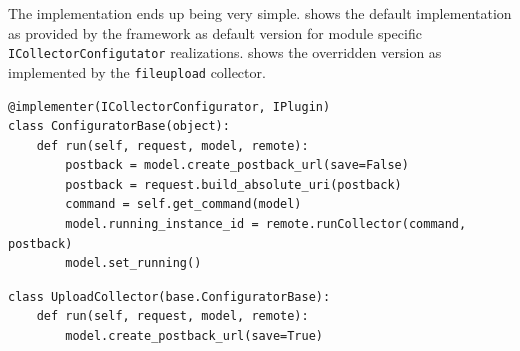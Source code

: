 The implementation ends up being very simple.  shows the default implementation as provided by the framework as default version for module specific \texttt{ICollector\BreakableSlash{}Configutator} realizations.  shows the overridden version as implemented by the \texttt{fileupload} collector.

\begin{lstlisting}[caption={Default implementation of the \texttt{run} method as found in the \texttt{ConfiguratorBase} class.},label=lst:run-base]
@implementer(ICollectorConfigurator, IPlugin)
class ConfiguratorBase(object):
    def run(self, request, model, remote):
        postback = model.create_postback_url(save=False)
        postback = request.build_absolute_uri(postback)
        command = self.get_command(model)
        model.running_instance_id = remote.runCollector(command, postback)
        model.set_running()
\end{lstlisting}

\begin{lstlisting}[caption={Custom implementation of the \texttt{run} method as found in the \texttt{UploadCollector} class.},label=lst:run-upload]
class UploadCollector(base.ConfiguratorBase):
    def run(self, request, model, remote):
        model.create_postback_url(save=True)
\end{lstlisting}


